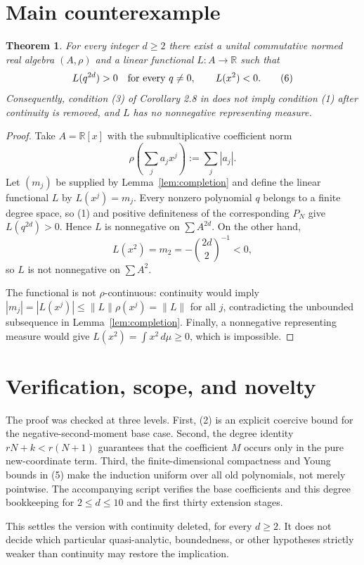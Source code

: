 \documentclass[11pt]{article}
\newtheorem{theorem}{Theorem}
\newcommand{\R}{\mathbb R}
\begin{document}
\section{Main counterexample}

\begin{theorem}\label{thm:main}
For every integer $d\ge2$ there exist a unital commutative normed real algebra
$(A,\rho)$ and a linear functional $L:A\to\R$ such that
\[
 L(q^{2d})>0\quad\hbox{for every }q\ne0,
 \qquad L(x^2)<0.
 \tag{6}
\]
Consequently, condition (3) of Corollary 2.8 in \cite{IK} does not imply
condition (1) after continuity is removed, and $L$ has no nonnegative
representing measure.
\end{theorem}

\begin{proof}
Take $A=\R[x]$ with the submultiplicative coefficient norm
\[
 \rho\!\left(\sum_ja_jx^j\right):=\sum_j|a_j|.
\]
Let $(m_j)$ be supplied by Lemma~\ref{lem:completion} and define the linear
functional $L$ by $L(x^j)=m_j$.  Every nonzero polynomial $q$ belongs to a
finite degree space, so (1) and positive definiteness of the corresponding
$P_N$ give $L(q^{2d})>0$.  Hence $L$ is nonnegative on
$\sum A^{2d}$.  On the other hand,
\[
 L(x^2)=m_2=-\binom{2d}{2}^{-1}<0,
\]
so $L$ is not nonnegative on $\sum A^2$.

The functional is not $\rho$-continuous: continuity would imply
$|m_j|=|L(x^j)|\le\|L\|\rho(x^j)=\|L\|$ for all $j$, contradicting the
unbounded subsequence in Lemma~\ref{lem:completion}.  Finally, a nonnegative
representing measure would give $L(x^2)=\int x^2\,d\mu\ge0$, which is
impossible.
\end{proof}

\section{Verification, scope, and novelty}

The proof was checked at three levels.  First, (2) is an explicit coercive
bound for the negative-second-moment base case.  Second, the degree identity
$rN+k<r(N+1)$ guarantees that the coefficient $M$ occurs only in the pure
new-coordinate term.  Third, the finite-dimensional compactness and Young
bounds in (5) make the induction uniform over all old polynomials, not merely
pointwise.  The accompanying script verifies the base coefficients and this
degree bookkeeping for $2\le d\le10$ and the first thirty extension stages.

This settles the version with continuity deleted, for every $d\ge2$.  It does
not decide which particular quasi-analytic, boundedness, or other hypotheses
strictly weaker than continuity may restore the implication.
\end{document}
